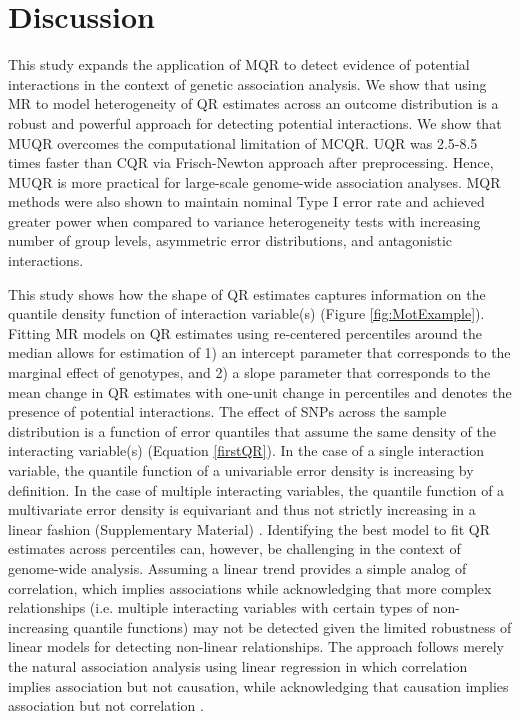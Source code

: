 \documentclass[12pt]{article}
\begin{document}

\section{Discussion}
This study expands the application of MQR to detect evidence of potential interactions in the context of genetic association analysis. We show that using MR to model heterogeneity of QR estimates across an outcome distribution is a robust and powerful approach for detecting potential interactions. We show that MUQR overcomes the computational limitation of MCQR. UQR was 2.5-8.5 times faster than CQR via Frisch-Newton approach after preprocessing. Hence, MUQR is more practical for large-scale genome-wide association analyses. MQR methods were also shown to maintain nominal Type I error rate and achieved greater power when compared to variance heterogeneity tests with increasing number of group levels, asymmetric error distributions, and antagonistic interactions. 

This study shows how the shape of QR estimates captures information on the quantile density function of interaction variable(s) (Figure \ref{fig:MotExample}). Fitting MR models on QR estimates using re-centered percentiles around the median allows for estimation of 1) an intercept parameter that corresponds to the marginal effect of genotypes, and 2) a slope parameter that corresponds to the mean change in QR estimates with one-unit change in percentiles and denotes the presence of potential interactions. The effect of SNPs across the sample distribution is a function of error quantiles that assume the same density of the interacting variable(s) (Equation \ref{firstQR}). In the case of a single interaction variable, the quantile function of a univariable error density is increasing by definition. In the case of multiple interacting variables, the quantile function of a multivariate error density is equivariant and thus not strictly increasing in a linear fashion (Supplementary Material) \cite{small1990survey, serfling2008mahalanobis}. Identifying the best model to fit QR estimates across percentiles can, however, be challenging in the context of genome-wide analysis. Assuming a linear trend provides a simple analog of correlation, which implies associations while acknowledging that more complex relationships (i.e. multiple interacting variables with certain types of non-increasing quantile functions) may not be detected given the limited robustness of linear models for detecting non-linear relationships. The approach follows merely the natural association analysis using linear regression in which correlation implies association but not causation, while acknowledging that causation implies association but not correlation \cite{altman2015points}. 
\end{document}
